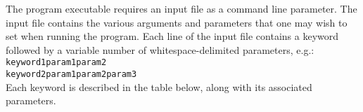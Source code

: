 The program executable requires an input file as a command line parameter. The input file contains the various arguments and parameters that one may wish to set when running the program. Each line of the input file contains a keyword followed by a variable number of whitespace-delimited parameters, e.g.: \\

\texttt{keyword1\qquad param1\qquad param2} \\
\texttt{keyword2\qquad param1\qquad param2\qquad param3} \\

Each keyword is described in the table below, along with its associated parameters.


\newcommand{\param}[1]{$\textless\texttt{#1}\textgreater$}
\newcommand\T{\rule{0pt}{3.5ex}}       %
\newcommand\B{\rule[-2ex]{0pt}{0pt}}

\newlength{\colthree}
\setlength{\colthree}{10.1cm}
\newlength{\coltwo}
\setlength{\coltwo}{2.9cm}

